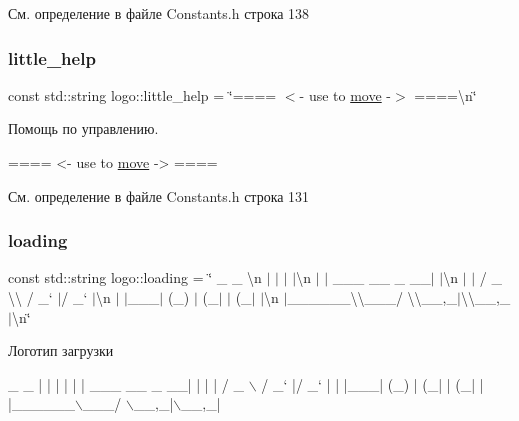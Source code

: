 См. определение в файле Constants.\+h строка 138

\mbox{\label{namespacelogo_adf18ab31906b644891fc8311df747a9d}} 
\subsubsection{\texorpdfstring{little\+\_\+help}{little\_help}}
{\footnotesize\ttfamily const std\+::string logo\+::little\+\_\+help = \char`\"{}==== $<$-\/ use to \hyperlink{namespacelogo_a03b6b80b5648e7dbbbf00b258df733b6}{move} -\/$>$ ====\textbackslash{}n\char`\"{}}

Помощь по управлению. 
\begin{DoxyCode}
==== <- use to \hyperlink{namespacelogo_a03b6b80b5648e7dbbbf00b258df733b6}{move} -> ====
\end{DoxyCode}
 

См. определение в файле Constants.\+h строка 131

\mbox{\label{namespacelogo_ad29ac81055f7eb3624a283f55af8d5ad}} 
\subsubsection{\texorpdfstring{loading}{loading}}
{\footnotesize\ttfamily const std\+::string logo\+::loading = \char`\"{} \+\_\+ \+\_\+ \textbackslash{}n $\vert$ $\vert$ $\vert$ $\vert$\textbackslash{}n $\vert$ $\vert$ \+\_\+\+\_\+\+\_\+ \+\_\+\+\_\+ \+\_\+ \+\_\+\+\_\+$\vert$ $\vert$\textbackslash{}n $\vert$ $\vert$ / \+\_\+ \textbackslash{}\textbackslash{} / \+\_\+` $\vert$/ \+\_\+` $\vert$\textbackslash{}n $\vert$ $\vert$\+\_\+\+\_\+\+\_\+$\vert$ (\+\_\+) $\vert$ (\+\_\+$\vert$ $\vert$ (\+\_\+$\vert$ $\vert$\textbackslash{}n $\vert$\+\_\+\+\_\+\+\_\+\+\_\+\+\_\+\+\_\+\textbackslash{}\textbackslash{}\+\_\+\+\_\+\+\_\+/ \textbackslash{}\textbackslash{}\+\_\+\+\_\+,\+\_\+$\vert$\textbackslash{}\textbackslash{}\+\_\+\+\_\+,\+\_\+$\vert$\textbackslash{}n\char`\"{}}

Логотип загрузки 
\begin{DoxyCode}
 \_                     \_ 
| |                   | |
| |     \_\_\_   \_\_ \_  \_\_| |
| |    / \_ \(\backslash\) / \_` |/ \_` |
| |\_\_\_| (\_) | (\_| | (\_| |
|\_\_\_\_\_\_\(\backslash\)\_\_\_/ \(\backslash\)\_\_,\_|\(\backslash\)\_\_,\_|  
\end{DoxyCode}
 

